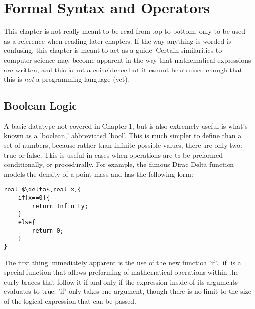 \chapter{Formal Syntax and Operators}
This chapter is not really meant to be read from top to bottom, only to be used as a reference when reading later chapters. If the way anything is worded is confusing, this chapter is meant to act as a guide. Certain similarities to computer science may become apparent in the way that mathematical expressions are written, and this is not a coincidence but it cannot be stressed enough that this is \emph{not} a programming language (yet).

\section{Boolean Logic}
A basic datatype not covered in Chapter 1, but is also extremely useful is what's known as a 'boolean,' abbreviated 'bool'. This is much simpler to define than a set of numbers, because rather than infinite possible values, there are only two: true or false. This is useful in cases when operations are to be preformed conditionally, or procedurally. For example, the famous Dirac Delta function models the density of a point-mass and has the following form:
\begin{verbatim}
real $\delta$[real x]{
	if[x==0]{
		return Infinity;
	}
	else{
		return 0;
	}
}
\end{verbatim}
The first thing immediately apparent is the use of the new function 'if'. 'if' is a special function that allows preforming of mathematical operations within the curly braces that follow it if and only if the expression inside of its arguments evaluates to true. 'if' only takes one argument, though there is no limit to the size of the logical expression that can be passed.
